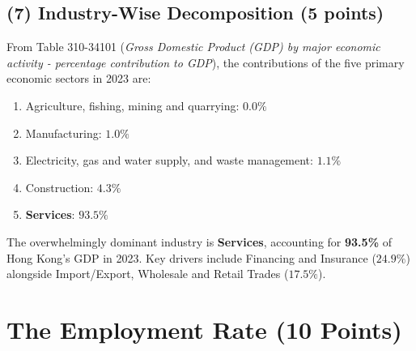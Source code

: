 \documentclass[11pt,a4paper]{article}
\begin{document}
\subsection*{(7) Industry-Wise Decomposition (5 points)}
From Table 310-34101 (\textit{Gross Domestic Product (GDP) by major economic activity - percentage contribution to GDP}), the contributions of the five primary economic sectors in 2023 are:
\begin{enumerate}
    \item Agriculture, fishing, mining and quarrying: $0.0\%$
    \item Manufacturing: $1.0\%$
    \item Electricity, gas and water supply, and waste management: $1.1\%$
    \item Construction: $4.3\%$
    \item \textbf{Services}: $\mathbf{93.5\%}$
\end{enumerate}
The overwhelmingly dominant industry is \textbf{Services}, accounting for \textbf{93.5\%} of Hong Kong's GDP in 2023. Key drivers include Financing and Insurance ($24.9\%$) alongside Import/Export, Wholesale and Retail Trades ($17.5\%$).

\section{The Employment Rate (10 Points)}
\end{document}
